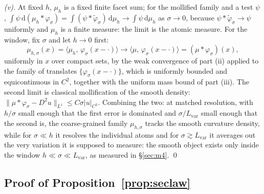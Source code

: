 \documentclass[11pt,a4paper]{article}
\theoremstyle{plain}
\theoremstyle{definition}
\theoremstyle{remark}
\begin{document}
\emph{(v).} At fixed $h$, $\mu_h$ is a fixed finite facet sum; for
the mollified family and a test $\psi$,
$\int \psi \,\mathrm{d}(\mu_h * \varphi_\sigma) = \int (\psi *
\tilde\varphi_\sigma)\,\mathrm{d}\mu_h \to \int \psi\,\mathrm{d}\mu_h$
as $\sigma \to 0$, because $\psi * \tilde\varphi_\sigma \to \psi$
uniformly and $\mu_h$ is a finite measure: the limit is the atomic
measure. For the window, fix $\sigma$ and let $h \to 0$ first:
\[
\mu_{h,\sigma}(x) = \bigl\langle \mu_h,\,
\varphi_\sigma(x - \cdot)\bigr\rangle \to \bigl\langle \mu,\,
\varphi_\sigma(x - \cdot)\bigr\rangle = (\mu * \varphi_\sigma)(x),
\]
uniformly in $x$ over compact sets, by the weak convergence of part
(ii) applied to the family of translates $\{\varphi_\sigma(x -
\cdot)\}$, which is uniformly bounded and equicontinuous in
$C^{2}$, together with the uniform mass bound of part (iii). The
second limit is classical mollification of the smooth density:
$\|\mu * \varphi_\sigma - D^{2}u\|_{L^{1}} \le C\sigma
|u|_{C^{3}}$. Combining the two: at matched resolution, with
$h/\sigma$ small enough that the first error is dominated and
$\sigma/L_{\mathrm{var}}$ small enough that the second is, the
coarse-grained family $\mu_{h,\sigma}$ tracks the smooth curvature
density, while for $\sigma \ll h$ it resolves the individual atoms
and for $\sigma \gtrsim L_{\mathrm{var}}$ it averages out the very
variation it is supposed to measure: the smooth object exists only
inside the window $h \ll \sigma \ll L_{\mathrm{var}}$, as measured in
\S\ref{sec:m4}. \qed

\subsection{Proof of Proposition~\ref{prop:seclaw}}
\end{document}
